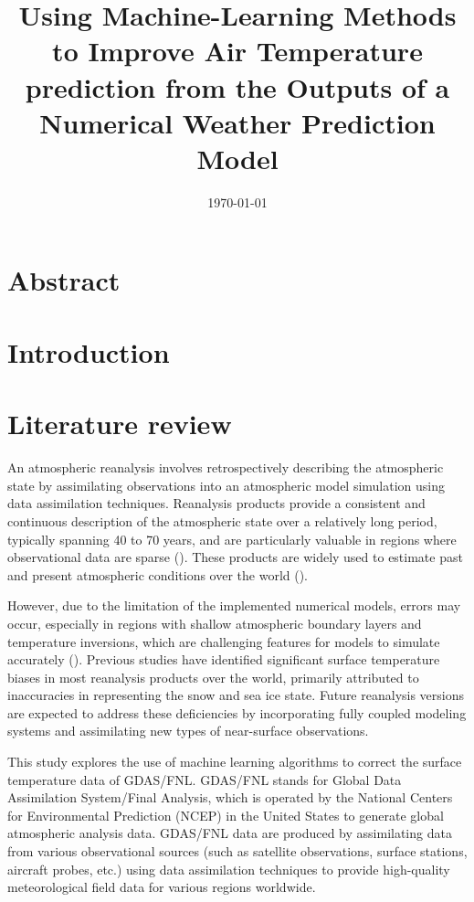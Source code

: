 \documentclass[12pt]{article}
\title{Using Machine-Learning Methods to Improve Air Temperature prediction from the Outputs of a Numerical Weather Prediction
Model}
\date{\today}
\begin{document}
	
\maketitle
	
\section*{Abstract}
\section{Introduction}
\section{Literature review}

An atmospheric reanalysis involves retrospectively describing the atmospheric state by assimilating observations into an atmospheric model simulation using data assimilation techniques. Reanalysis products provide a consistent and continuous description of the atmospheric state over a relatively long period, typically spanning 40 to 70 years, and are particularly valuable in regions where observational data are sparse (\cite{Jung2016}). These products are widely used to estimate past and present atmospheric conditions over the world (\cite{Large2009,Tsujino2018}).

However, due to the limitation of the implemented numerical models, errors may occur, especially in regions with shallow atmospheric boundary layers and temperature inversions, which are challenging features for models to simulate accurately (\cite{Zampieri2018}). Previous studies have identified significant surface temperature biases in most reanalysis products over the world, primarily attributed to inaccuracies in representing the snow and sea ice state. Future reanalysis versions are expected to address these deficiencies by incorporating fully coupled modeling systems and assimilating new types of near-surface observations. 

This study explores the use of machine learning algorithms to correct the surface temperature data of GDAS/FNL. GDAS/FNL stands for Global Data Assimilation System/Final Analysis, which is operated by the National Centers for Environmental Prediction (NCEP) in the United States to generate global atmospheric analysis data. GDAS/FNL data are produced by assimilating data from various observational sources (such as satellite observations, surface stations, aircraft probes, etc.) using data assimilation techniques to provide high-quality meteorological field data for various regions worldwide. 
\end{document}
